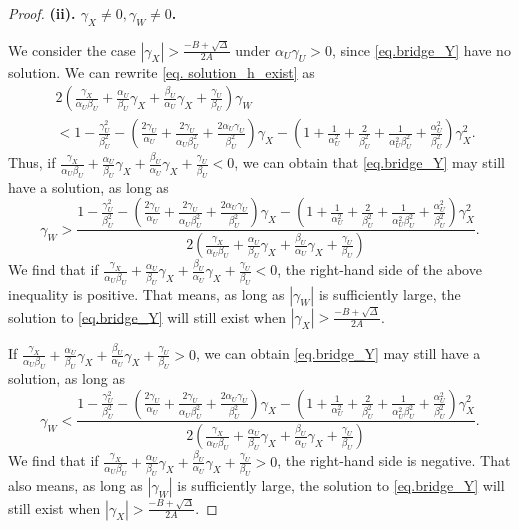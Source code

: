 \documentclass[10pt,a4paper]{amsart}
\begin{document}
\begin{proof}
\textbf{(ii). $\gamma_X\ne0,\gamma_W\ne0$.} 

We consider the case $|\gamma_X|>\frac{-B+\sqrt{\Delta}}{2A}$ under $\alpha_U\gamma_U>0$, since  \eqref{eq.bridge_Y} have no solution. We can rewrite  \eqref{eq. solution_h_exist} as
\begin{align*}
    & 2\left( \frac{\gamma_X}{\alpha_U\beta_U}+\frac{\alpha_U}{\beta_U}\gamma_X+\frac{\beta_U}{\alpha_U}\gamma_X+\frac{\gamma_U}{\beta_U} \right) \gamma_W \\
    & <1-\frac{\gamma_{U}^{2}}{\beta_{U}^{2}}-\left( \frac{2\gamma_U}{\alpha_U}+\frac{2\gamma_U}{\alpha_U\beta_{U}^{2}}+\frac{2\alpha_U\gamma_U}{\beta_{U}^{2}} \right) \gamma_X-\left( 1+\frac{1}{\alpha_{U}^{2}}+\frac{2}{\beta_{U}^{2}}+\frac{1}{\alpha_{U}^{2}\beta_{U}^{2}}+\frac{\alpha_{U}^{2}}{\beta_{U}^{2}} \right) \gamma_{X}^{2}.
\end{align*}
Thus, if $\frac{\gamma_X}{\alpha_U\beta_U}+\frac{\alpha_U}{\beta_U}\gamma_X+\frac{\beta_U}{\alpha_U}\gamma_X+\frac{\gamma_U}{\beta_U}<0$, we can obtain that \eqref{eq.bridge_Y} may still have a solution, as long as
$$
\gamma_W>\frac{1-\frac{\gamma_{U}^{2}}{\beta_{U}^{2}}-\left( \frac{2\gamma_U}{\alpha_U}+\frac{2\gamma_U}{\alpha_U\beta_{U}^{2}}+\frac{2\alpha_U\gamma_U}{\beta_{U}^{2}} \right) \gamma_X-\left( 1+\frac{1}{\alpha_{U}^{2}}+\frac{2}{\beta_{U}^{2}}+\frac{1}{\alpha_{U}^{2}\beta_{U}^{2}}+\frac{\alpha_{U}^{2}}{\beta_{U}^{2}} \right) \gamma_{X}^{2}}{2\left( \frac{\gamma_X}{\alpha_U\beta_U}+\frac{\alpha_U}{\beta_U}\gamma_X+\frac{\beta_U}{\alpha_U}\gamma_X+\frac{\gamma_U}{\beta_U} \right)}.
$$
We find that if $\frac{\gamma_X}{\alpha_U\beta_U}+\frac{\alpha_U}{\beta_U}\gamma_X+\frac{\beta_U}{\alpha_U}\gamma_X+\frac{\gamma_U}{\beta_U}<0$, the right-hand side of the above inequality is positive. That means, as long as $|\gamma_W|$ is sufficiently large, the solution to  \eqref{eq.bridge_Y} will still exist when $|\gamma_X|>\frac{-B+\sqrt{\Delta}}{2A}$.


If $\frac{\gamma_X}{\alpha_U\beta_U}+\frac{\alpha_U}{\beta_U}\gamma_X+\frac{\beta_U}{\alpha_U}\gamma_X+\frac{\gamma_U}{\beta_U}>0$, we can obtain \eqref{eq.bridge_Y} may still have a solution, as long as
$$
\gamma_W<\frac{1-\frac{\gamma_{U}^{2}}{\beta_{U}^{2}}-\left( \frac{2\gamma_U}{\alpha_U}+\frac{2\gamma_U}{\alpha_U\beta_{U}^{2}}+\frac{2\alpha_U\gamma_U}{\beta_{U}^{2}} \right) \gamma_X-\left( 1+\frac{1}{\alpha_{U}^{2}}+\frac{2}{\beta_{U}^{2}}+\frac{1}{\alpha_{U}^{2}\beta_{U}^{2}}+\frac{\alpha_{U}^{2}}{\beta_{U}^{2}} \right) \gamma_{X}^{2}}{2\left( \frac{\gamma_X}{\alpha_U\beta_U}+\frac{\alpha_U}{\beta_U}\gamma_X+\frac{\beta_U}{\alpha_U}\gamma_X+\frac{\gamma_U}{\beta_U} \right)}.
$$
We find that if $\frac{\gamma_X}{\alpha_U\beta_U}+\frac{\alpha_U}{\beta_U}\gamma_X+\frac{\beta_U}{\alpha_U}\gamma_X+\frac{\gamma_U}{\beta_U}>0$, the right-hand side is negative. That also means,  as long as $|\gamma_W|$ is sufficiently large, the solution to \eqref{eq.bridge_Y} will still exist when $|\gamma_X|>\frac{-B+\sqrt{\Delta}}{2A}$.


\end{proof}
\end{document}
